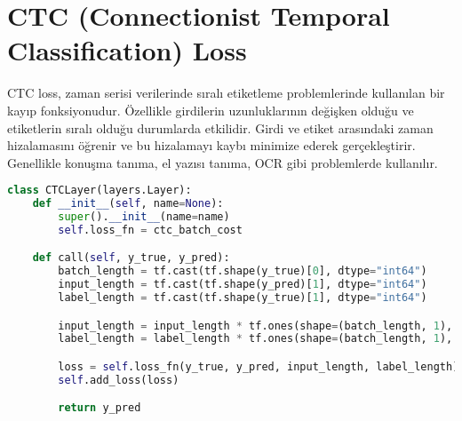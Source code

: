 \section{CTC (Connectionist Temporal Classification) Loss}
CTC loss, zaman serisi verilerinde sıralı etiketleme problemlerinde kullanılan bir kayıp fonksiyonudur. Özellikle girdilerin uzunluklarının değişken olduğu ve etiketlerin sıralı olduğu durumlarda etkilidir. Girdi ve etiket arasındaki zaman hizalamasını öğrenir ve bu hizalamayı kaybı minimize ederek gerçekleştirir. Genellikle konuşma tanıma, el yazısı tanıma, OCR gibi problemlerde kullanılır.

\begin{lstlisting}[language=Python]
class CTCLayer(layers.Layer):
    def __init__(self, name=None):
        super().__init__(name=name)
        self.loss_fn = ctc_batch_cost

    def call(self, y_true, y_pred):
        batch_length = tf.cast(tf.shape(y_true)[0], dtype="int64")
        input_length = tf.cast(tf.shape(y_pred)[1], dtype="int64")
        label_length = tf.cast(tf.shape(y_true)[1], dtype="int64")

        input_length = input_length * tf.ones(shape=(batch_length, 1), dtype="int64")
        label_length = label_length * tf.ones(shape=(batch_length, 1), dtype="int64")

        loss = self.loss_fn(y_true, y_pred, input_length, label_length)
        self.add_loss(loss)

        return y_pred
\end{lstlisting}

\newpage